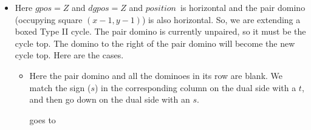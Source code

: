 \documentclass[12pt]{article}
\numberwithin{equation}{section}
\newcommand{\horizontalDominoRSShift}[4]{\filldraw [dominoRSStyle] (#2 - 1 + #4 + \eps, #1 - 1 + \eps) rectangle + (2 - \teps, 1 -\teps) node [dominoText] {$#3$};}
\newcommand{\verticalDominoRSShift}[4]{\filldraw [dominoRSStyle] (#2 - 1 + #4 + \eps,  #1 - 1 + \eps) rectangle + (1 - \teps,2 -\teps) node [dominoText] {$#3$};}
\newcommand{\pos}{$position$}
\begin{document}
\begin{itemize}
\begin{itemize}
\begin{figure}[H]
      \end{figure}
    \end{itemize}

    \item Here $gpos = Z$ and $dgpos = Z$ and \pos\ is horizontal and the pair domino (occupying square $(x - 1, y - 1)$) is also horizontal.
    So, we are extending a boxed Type II cycle.
    The pair domino is currently unpaired, so it must be the cycle top.
    The domino to the right of the pair domino will become the new cycle top.
    Here are the cases.
    \begin{itemize}
      \item Here the pair domino and all the dominoes in its row are blank.
      We match the sign ($s$) in the corresponding column on the dual side with a $t$, and then go down on the dual side with an $s$.
      \begin{figure}[H]
        \centering
      \end{figure}
      goes to
      \begin{figure}[H]
        \centering
\end{figure}
\end{itemize}
\end{itemize}
\end{document}
